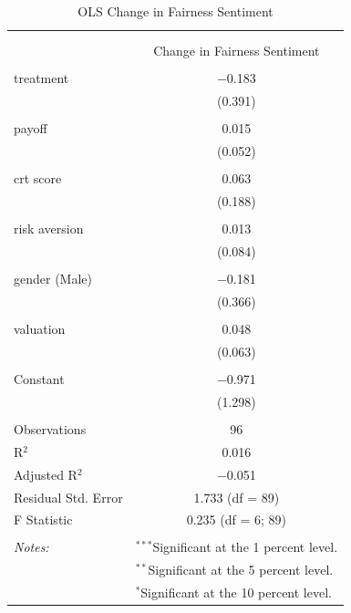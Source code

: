 \begin{table}[!htbp] \centering 
  \caption{OLS Change in Fairness Sentiment} 
  \label{tab:fair_ols} 
\begin{tabular}{@{\extracolsep{5pt}}lc} 
\\[-1.8ex]\hline 
\hline \\[-1.8ex] 
\\[-1.8ex] & Change in Fairness Sentiment \\ 
\hline \\[-1.8ex] 
 treatment & $-$0.183 \\ 
  & (0.391) \\ 
  & \\ 
 payoff & 0.015 \\ 
  & (0.052) \\ 
  & \\ 
 crt score & 0.063 \\ 
  & (0.188) \\ 
  & \\ 
 risk aversion & 0.013 \\ 
  & (0.084) \\ 
  & \\ 
 gender (Male) & $-$0.181 \\ 
  & (0.366) \\ 
  & \\ 
 valuation & 0.048 \\ 
  & (0.063) \\ 
  & \\ 
 Constant & $-$0.971 \\ 
  & (1.298) \\ 
  & \\ 
  \hline
Observations & 96 \\ 
R$^{2}$ & 0.016 \\ 
Adjusted R$^{2}$ & $-$0.051 \\ 
Residual Std. Error & 1.733 (df = 89) \\ 
F Statistic & 0.235 (df = 6; 89) \\ 
\hline \\[-1.8ex] 
\textit{Notes:} & \multicolumn{1}{l}{$^{***}$Significant at the 1 percent level.} \\ 
 & \multicolumn{1}{l}{$^{**}$Significant at the 5 percent level.} \\ 
 & \multicolumn{1}{l}{$^{*}$Significant at the 10 percent level.} \\ 
\end{tabular} 
\end{table} 

